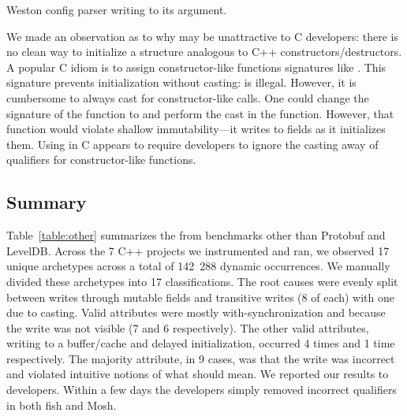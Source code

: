 \begin{listing}[!htb]
  \caption{Weston config parser writing to its  argument.}
  \label{listing-weston-config}
  \centering
  
\end{listing}

We made an observation as to why \const{} may be unattractive to C developers:
there is no clean way to initialize a structure analogous to C++
constructors/destructors.
A popular C idiom is to assign constructor-like functions signatures like
.
This signature prevents initialization without casting:  is illegal.
However, it is cumbersome to always cast for constructor-like calls.
One could change the signature of the function to  and perform the cast in the function.
However, that function would violate shallow immutability---it writes to fields
as it initializes them.
Using \const{} in C appears to require developers to ignore the casting away of
\const{} qualifiers for constructor-like functions.

\subsection{Summary}
\label{section:results-summary}

Table~\ref{table:other} summarizes the \wstcqs{} from benchmarks other than
Protobuf and LevelDB.
Across the 7 C++ projects we instrumented and ran, we observed 17 unique
archetypes across a total of 142~288 dynamic occurrences.
We manually divided these archetypes into 17 classifications.
The root causes were evenly split between writes through mutable fields and
transitive writes (8 of each) with one \wtc{} due to casting.
Valid attributes were mostly with-synchronization and because the write was not
visible (7 and 6 respectively).
The other valid attributes, writing to a buffer/cache and delayed
initialization, occurred 4 times and 1 time respectively.
The majority attribute, in 9 cases, was that the write was incorrect and
violated intuitive notions of what \const{} should mean.
We reported our results to developers. 
Within a few days the developers simply removed incorrect \const{} qualifiers
in both fish and Mosh.

